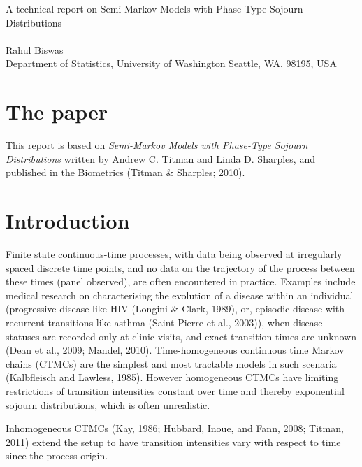 \documentclass{uwstat572}
\begin{document}

\begin{center}
  {\LARGE A technical report on Semi-Markov Models with Phase-Type Sojourn Distributions}\\\ \\
  {Rahul Biswas \\ 
    Department of Statistics, University of Washington Seattle, WA, 98195, USA
  }
\end{center}
\nocite{*}
\section*{The paper}
This report is based on \textit{Semi-Markov Models with Phase-Type Sojourn Distributions} written by Andrew C. Titman and Linda D. Sharples, and published in the Biometrics (Titman \& Sharples; 2010).

\section{Introduction}

Finite state continuous-time processes, with data being observed at irregularly spaced discrete time points, and no data on the trajectory of the process between these times (panel observed), are often encountered in practice. Examples include medical research on characterising the evolution of a disease within an individual (progressive disease like HIV (Longini \& Clark, 1989), or, episodic disease with recurrent transitions like asthma (Saint-Pierre et al., 2003)), when disease statuses are recorded only at clinic visits, and exact transition times are unknown (Dean et al., 2009; Mandel, 2010).
Time-homogeneous continuous time Markov chains (CTMCs) are the simplest and most tractable models in such scenaria (Kalbfleisch and Lawless, 1985). However homogeneous CTMCs have limiting restrictions of transition intensities constant over time and thereby exponential sojourn distributions, which is often unrealistic.

Inhomogeneous CTMCs (Kay, 1986; Hubbard, Inoue, and Fann, 2008; Titman, 2011) extend the setup to have transition intensities vary with respect to time since the process origin. 
\end{document}
